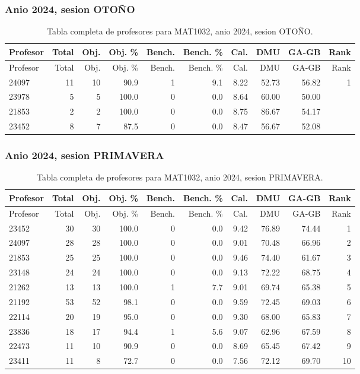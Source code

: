 \subsubsection{Anio 2024, sesion OTOÑO}

\begingroup
\scriptsize
\setlength{\tabcolsep}{3pt}
\begin{longtable}{lrrrrrrrrr}
\caption{Tabla completa de profesores para MAT1032, anio 2024, sesion OTOÑO.}\label{tab:prof-period-mat1032-2024-oto-o}\\
\toprule
Profesor & Total & Obj. & Obj. \% & Bench. & Bench. \% & Cal. & DMU & GA-GB & Rank \\
\midrule
\endfirsthead
\toprule
Profesor & Total & Obj. & Obj. \% & Bench. & Bench. \% & Cal. & DMU & GA-GB & Rank \\
\midrule
\endhead
24097 & 11 & 10 & 90.9 & 1 & 9.1 & 8.22 & 52.73 & 56.82 & 1 \\
23978 & 5 & 5 & 100.0 & 0 & 0.0 & 8.64 & 60.00 & 50.00 &  \\
21853 & 2 & 2 & 100.0 & 0 & 0.0 & 8.75 & 86.67 & 54.17 &  \\
23452 & 8 & 7 & 87.5 & 0 & 0.0 & 8.47 & 56.67 & 52.08 &  \\
\bottomrule
\end{longtable}
\endgroup

\subsubsection{Anio 2024, sesion PRIMAVERA}

\begingroup
\scriptsize
\setlength{\tabcolsep}{3pt}
\begin{longtable}{lrrrrrrrrr}
\caption{Tabla completa de profesores para MAT1032, anio 2024, sesion PRIMAVERA.}\label{tab:prof-period-mat1032-2024-primavera}\\
\toprule
Profesor & Total & Obj. & Obj. \% & Bench. & Bench. \% & Cal. & DMU & GA-GB & Rank \\
\midrule
\endfirsthead
\toprule
Profesor & Total & Obj. & Obj. \% & Bench. & Bench. \% & Cal. & DMU & GA-GB & Rank \\
\midrule
\endhead
23452 & 30 & 30 & 100.0 & 0 & 0.0 & 9.42 & 76.89 & 74.44 & 1 \\
24097 & 28 & 28 & 100.0 & 0 & 0.0 & 9.01 & 70.48 & 66.96 & 2 \\
21853 & 25 & 25 & 100.0 & 0 & 0.0 & 9.46 & 74.40 & 61.67 & 3 \\
23148 & 24 & 24 & 100.0 & 0 & 0.0 & 9.13 & 72.22 & 68.75 & 4 \\
21262 & 13 & 13 & 100.0 & 1 & 7.7 & 9.01 & 69.74 & 65.38 & 5 \\
21192 & 53 & 52 & 98.1 & 0 & 0.0 & 9.59 & 72.45 & 69.03 & 6 \\
22114 & 20 & 19 & 95.0 & 0 & 0.0 & 9.30 & 68.00 & 65.83 & 7 \\
23836 & 18 & 17 & 94.4 & 1 & 5.6 & 9.07 & 62.96 & 67.59 & 8 \\
22473 & 11 & 10 & 90.9 & 0 & 0.0 & 8.69 & 65.45 & 67.42 & 9 \\
23411 & 11 & 8 & 72.7 & 0 & 0.0 & 7.56 & 72.12 & 69.70 & 10 \\
\bottomrule
\end{longtable}
\endgroup

